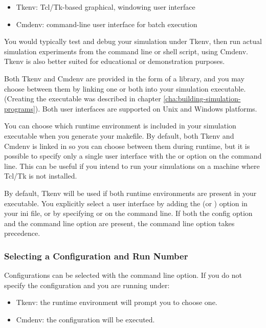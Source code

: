 \begin{itemize}
  \item Tkenv: Tcl/Tk-based graphical, windowing user interface
  \item Cmdenv: command-line user interface for batch execution
\end{itemize}

You would typically test and debug your simulation under Tkenv,
then run actual simulation experiments from the command line or
shell script, using Cmdenv. Tkenv is also better suited for educational or
demonstration purposes.

Both Tkenv and Cmdenv are provided in the form of a library, and
you may choose between them by linking one or both into your
simulation executable. (Creating the executable was described in
chapter \ref{cha:building-simulation-programs}). Both user interfaces
are supported on Unix and Windows platforms.

You can choose which runtime environment is included in your simulation
executable when you generate your makefile. By default, both Tkenv and
Cmdenv is linked in so you can choose between them during runtime, but it
is possible to specify only a single user interface with the  or  option on the  command line.
This can be useful if you intend to run your simulations on a machine where
Tcl/Tk is not installed.

By default, Tkenv will be used if both runtime environments are present in
your executable. You explicitly select a user interface by adding the
 (or ) option in your ini file, or
by specifying  or  on the command line. If
both the config option and the command line option are present, the command
line option takes precedence.

\subsubsection{Selecting a Configuration and Run Number}

Configurations can be selected with the  command line option.
If you do not specify the configuration and you are running under:

\begin{itemize}
  \item Tkenv: the runtime environment will prompt you to choose one.
  \item Cmdenv: the  configuration will be executed.
\end{itemize}

